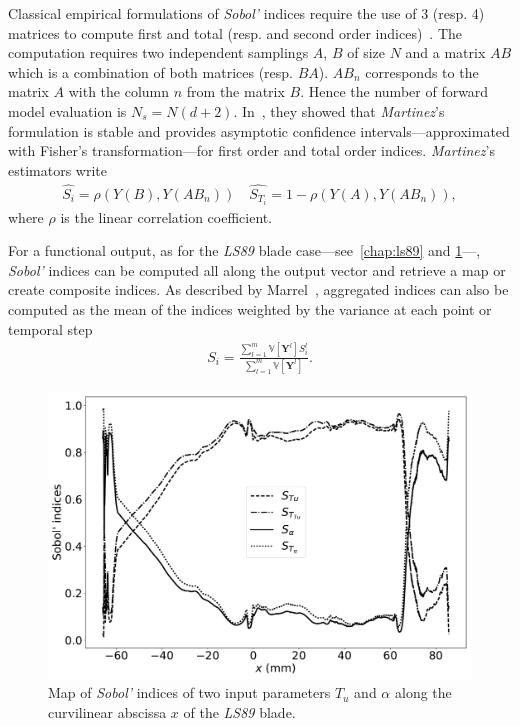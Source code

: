 Classical empirical formulations of \emph{Sobol'} indices require the use of 3 (resp. 4) matrices to compute first and total (resp. and second order indices)~\cite{Saltelli2010}. The computation requires two independent samplings $A$, $B$ of size $N$ and a matrix $AB$ which is a combination of both matrices (resp. $BA$). $AB_{n}$ corresponds to the matrix $A$ with the column $n$ from the matrix $B$. Hence the number of forward model evaluation is $N_s = N(d + 2)$. In~\citep{baudin2016}, they showed that \textit{Martinez}'s formulation is stable and provides asymptotic confidence intervals---approximated with Fisher's transformation---for first order and total order indices. \textit{Martinez}'s estimators write
\begin{align}
\hat{S_i} = \rho (Y(B), Y(AB_{n})) \quad \hat{S_{T_i}} = 1 - \rho (Y(A), Y(AB_n)),
\end{align}
\noindent where $\rho$ is the linear correlation coefficient.

For a functional output, as for the \textit{LS89} blade case---see~\cref{chap:ls89} and \cref{fig:map_sobol}---, \textit{Sobol'} indices can be computed all along the output vector and retrieve a map or create composite indices. As described by Marrel~\cite{marrel2015}, aggregated indices can also be computed as the mean of the indices weighted by the variance at each point or temporal step
\begin{align}
S_i = \frac{\displaystyle\sum_{l = 1}^{m} \mathbb{V} [\mathbf{Y}^l] S_i^{l}}{\displaystyle\sum_{l = 1}^{m} \mathbb{V} [\mathbf{Y}^l]}.
\end{align}

\begin{figure}[ht]
\centering
\includegraphics[width=0.8\linewidth,keepaspectratio]{fig/literature/sobol_map.pdf}
\caption{Map of \emph{Sobol'} indices of two input parameters $T_{u}$ and $\alpha$ along the curvilinear abscissa $x$ of the \textit{LS89} blade.}
\label{fig:map_sobol}
\end{figure}

